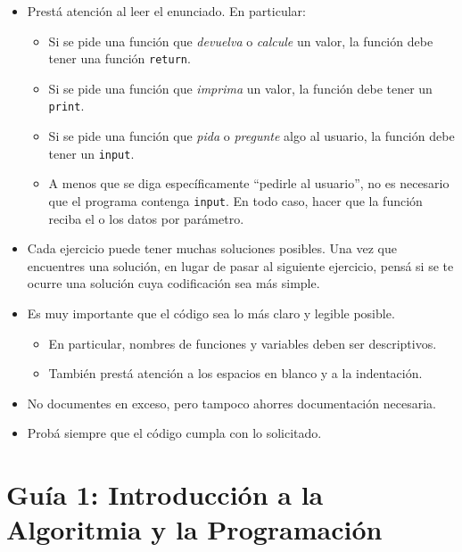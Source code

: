 \documentclass[
  letterpaper,
  DIV=11,
  numbers=noendperiod]{scrreprt}
\providecommand{\tightlist}{%
  \setlength{\itemsep}{0pt}\setlength{\parskip}{0pt}}\usepackage{longtable,booktabs,array}
\begin{document}
\begin{itemize}
\tightlist
\item
  Prestá atención al leer el enunciado. En particular:

  \begin{itemize}
  \tightlist
  \item
    Si se pide una función que \emph{devuelva} o \emph{calcule} un
    valor, la función debe tener una función \texttt{return}.
  \item
    Si se pide una función que \emph{imprima} un valor, la función debe
    tener un \texttt{print}.
  \item
    Si se pide una función que \emph{pida} o \emph{pregunte} algo al
    usuario, la función debe tener un \texttt{input}.
  \item
    A menos que se diga específicamente ``pedirle al usuario'', no es
    necesario que el programa contenga \texttt{input}. En todo caso,
    hacer que la función reciba el o los datos por parámetro.
  \end{itemize}
\item
  Cada ejercicio puede tener muchas soluciones posibles. Una vez que
  encuentres una solución, en lugar de pasar al siguiente ejercicio,
  pensá si se te ocurre una solución cuya codificación sea más simple.
\item
  Es muy importante que el código sea lo más claro y legible posible.

  \begin{itemize}
  \tightlist
  \item
    En particular, nombres de funciones y variables deben ser
    descriptivos.
  \item
    También prestá atención a los espacios en blanco y a la indentación.
  \end{itemize}
\item
  No documentes en exceso, pero tampoco ahorres documentación necesaria.
\item
  Probá siempre que el código cumpla con lo solicitado.
\end{itemize}

\section*{Guía 1: Introducción a la Algoritmia y la
Programación}\label{guuxeda-1-introducciuxf3n-a-la-algoritmia-y-la-programaciuxf3n}
\end{document}
